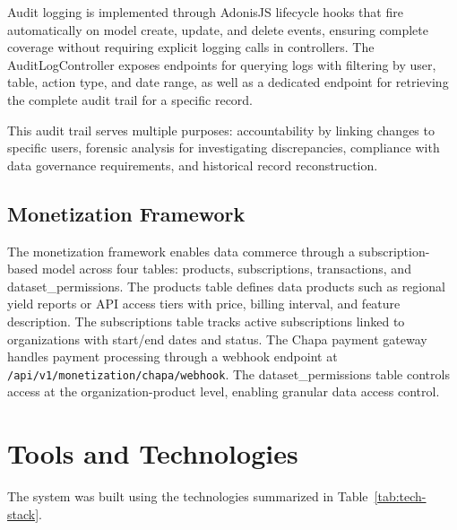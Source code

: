 \documentclass[12pt,a4paper,oneside]{report}
\begin{document}
Audit logging is implemented through AdonisJS lifecycle hooks that fire automatically on model create, update, and delete events, ensuring complete coverage without requiring explicit logging calls in controllers. The AuditLogController exposes endpoints for querying logs with filtering by user, table, action type, and date range, as well as a dedicated endpoint for retrieving the complete audit trail for a specific record.

This audit trail serves multiple purposes: accountability by linking changes to specific users, forensic analysis for investigating discrepancies, compliance with data governance requirements, and historical record reconstruction.

\subsection{Monetization Framework}
The monetization framework enables data commerce through a subscription-based model across four tables: products, subscriptions, transactions, and dataset\_permissions. The products table defines data products such as regional yield reports or API access tiers with price, billing interval, and feature description. The subscriptions table tracks active subscriptions linked to organizations with start/end dates and status. The Chapa payment gateway handles payment processing through a webhook endpoint at \texttt{/api/v1/monetization/chapa/webhook}. The dataset\_permissions table controls access at the organization-product level, enabling granular data access control.

\section{Tools and Technologies}
The system was built using the technologies summarized in Table~\ref{tab:tech-stack}.
\end{document}
